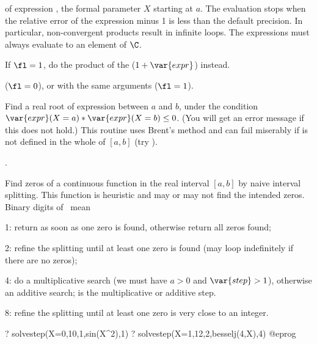 \label{se:prodinf}
 of
expression , the formal parameter $X$ starting at $a$. The evaluation
stops when the relative error of the expression minus 1 is less than the
default precision. In particular, non-convergent products result in infinite
loops. The expressions must always evaluate to an element of $\C$.

If $\fl=1$, do the product of the ($1+\var{expr}$) instead.

($\fl=0$), or  with the same arguments ($\fl=1$).

\label{se:solve}
Find a real root of expression
 between $a$ and $b$, under the condition
$\var{expr}(X=a) * \var{expr}(X=b) \le 0$. (You will get an error message
 if this does not hold.)
This routine uses Brent's method and can fail miserably if  is
not defined in the whole of $[a,b]$ (try ).

.

\label{se:solvestep}
Find zeros of a continuous function in the real interval $[a,b]$ by naive
interval splitting. This function is heuristic and may or may not find the
intended zeros. Binary digits of \fl\ mean

\item 1: return as soon as one zero is found, otherwise return all
zeros found;

\item 2: refine the splitting until at least one zero is found
(may loop indefinitely if there are no zeros);

\item 4: do a multiplicative search (we must have $a > 0$ and $\var{step} >
1$), otherwise an additive search;  is the multiplicative or
additive step.

\item 8: refine the splitting until at least one zero is very close to an
integer.

\bprog
? solvestep(X=0,10,1,sin(X^2),1)
? solvestep(X=1,12,2,besselj(4,X),4)
@eprog\noindent

